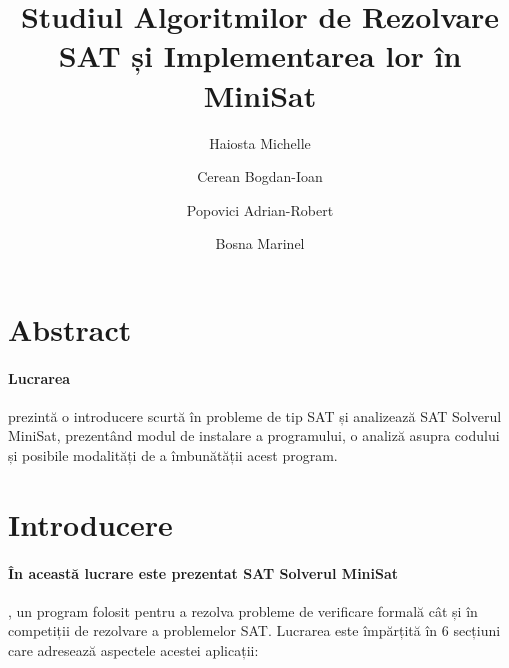\documentclass[runningheads]{llncs}
\begin{document}
%
\title{Studiul Algoritmilor de Rezolvare SAT și Implementarea lor în MiniSat}
%
%
\author{Haiosta Michelle \and
Cerean Bogdan-Ioan \and
Popovici Adrian-Robert \and
Bosna Marinel}


%
\maketitle              %
%

\section*{Abstract}
\paragraph{Lucrarea} prezintă o introducere scurtă în probleme de tip SAT și analizează SAT Solverul MiniSat, prezentând modul de instalare a programului, o analiză asupra codului și posibile modalități de a îmbunătății acest program.


\newpage
%
%
%

\section{Introducere}
\paragraph{În această lucrare este prezentat SAT Solverul MiniSat}, un program folosit pentru a rezolva probleme de verificare formală cât și în competiții de rezolvare a problemelor SAT. Lucrarea este împărțită în 6 secțiuni care adresează aspectele acestei aplicații: 
\end{document}
